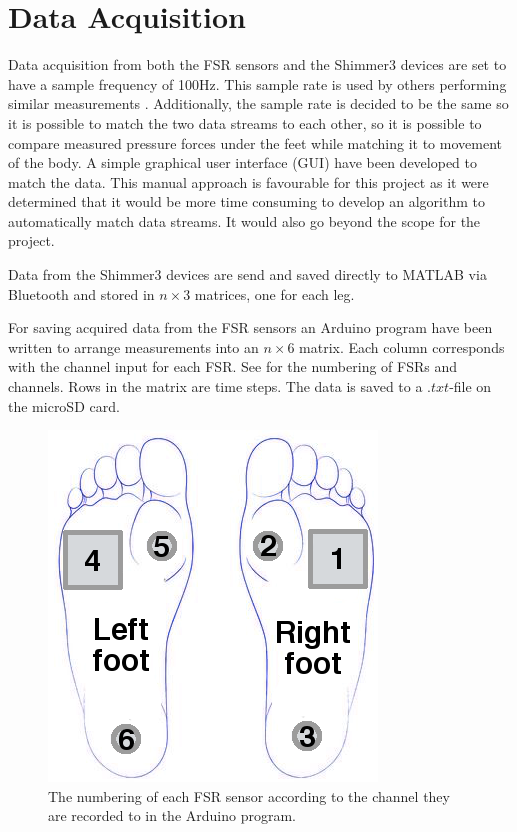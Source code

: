 \section{Data Acquisition}

Data acquisition from both the FSR sensors and the Shimmer3 devices are set to have a sample frequency of 100Hz. This sample rate is used by others performing similar measurements \cite{Verkerke2005, Byun2016, Sherwani2016}. Additionally, the sample rate is decided to be the same so it is possible to match the two data streams to each other, so it is possible to compare measured pressure forces under the feet while matching it to movement of the body. A simple graphical user interface (GUI) have been developed to match the data. This manual approach is favourable for this project as it were determined that it would be more time consuming to develop an algorithm to automatically match data streams. It would also go beyond the scope for the project.

Data from the Shimmer3 devices are send and saved directly to MATLAB via Bluetooth and stored in $n\times3$ matrices, one for each leg.

For saving acquired data from the FSR sensors an Arduino program have been written to arrange measurements into an $n\times6$ matrix. Each column corresponds with the channel input for each FSR. See  for the numbering of FSRs and channels. Rows in the matrix are time steps. The data is saved to a $.txt$-file on the microSD card. 

\begin{figure}[H]
	\includegraphics[width=.3\textwidth]{figures/FSRNumbering}
	\caption{The numbering of each FSR sensor according to the channel they are recorded to in the Arduino program.}
	\label{fig:FSRNumbering}  %
\end{figure}



